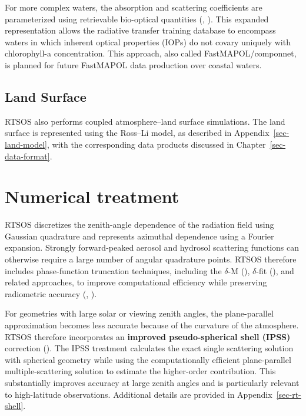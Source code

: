 \documentclass[
  11pt,
  letterpaper,
]{scrreprt}
\begin{document}
For more complex waters, the absorption and scattering coefficients are
parameterized using retrievable bio-optical quantities
(,
). This expanded representation allows
the radiative transfer training database to encompass waters in which
inherent optical properties (IOPs) do not covary uniquely with
chlorophyll-a concentration. This approach, also called
FastMAPOL/componnet, is planned for future FastMAPOL data production
over coastal waters.

\subsection{Land Surface}\label{land-surface}

RTSOS also performs coupled atmosphere--land surface simulations. The
land surface is represented using the Ross--Li model, as described in
Appendix~\ref{sec-land-model}, with the corresponding data products
discussed in Chapter~\ref{sec-data-format}.

\section{Numerical treatment}\label{numerical-treatment}

RTSOS discretizes the zenith-angle dependence of the radiation field
using Gaussian quadrature and represents azimuthal dependence using a
Fourier expansion. Strongly forward-peaked aerosol and hydrosol
scattering functions can otherwise require a large number of angular
quadrature points. RTSOS therefore includes phase-function truncation
techniques, including the \(\delta\)-M
(), \(\delta\)-fit
(), and related approaches, to
improve computational efficiency while preserving radiometric accuracy
(,
).

For geometries with large solar or viewing zenith angles, the
plane-parallel approximation becomes less accurate because of the
curvature of the atmosphere. RTSOS therefore incorporates an
\textbf{improved pseudo-spherical shell (IPSS)} correction
(). The IPSS treatment
calculates the exact single scattering solution with spherical geometry
while using the computationally efficient plane-parallel
multiple-scattering solution to estimate the higher-order contribution.
This substantially improves accuracy at large zenith angles and is
particularly relevant to high-latitude observations. Additional details
are provided in Appendix~\ref{sec-rt-shell}.
\end{document}
